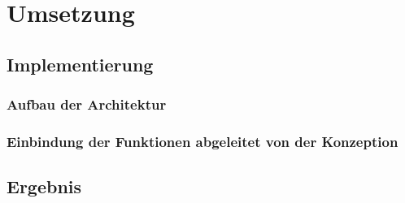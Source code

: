 \chapter{Umsetzung}
\label{chap:umsetzung}
\section{Implementierung}
\subsection{Aufbau der Architektur}
\subsection{Einbindung der Funktionen abgeleitet von der Konzeption}
\section{Ergebnis}